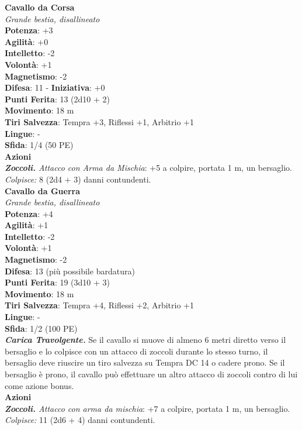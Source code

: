 \begin{multicols}{2}
\medskip\textbf{Cavallo da Corsa}\\
\emph{Grande bestia, disallineato}\\
\textbf{Potenza}: +3\\
\textbf{Agilità}: +0\\
\textbf{Intelletto}: -2\\
\textbf{Volontà}: +1\\
\textbf{Magnetismo}: -2\\
\textbf{Difesa}: 11 - \textbf{Iniziativa}: +0\\
\textbf{Punti Ferita}: 13 (2d10 + 2)\\
\textbf{Movimento}: 18 m\\
\textbf{Tiri Salvezza}: Tempra +3, Riflessi +1, Arbitrio +1 \\
\textbf{Lingue}: -\\
\textbf{Sfida}: 1/4 (50 PE)\smallskip\\
\smallskip\textbf{Azioni}\\
\emph{\textbf{Zoccoli.} Attacco con Arma da Mischia}: +5 a colpire, portata 1 m, un bersaglio.\\
\emph{Colpisce:} 8 (2d4 + 3) danni contundenti.\\

\medskip\textbf{Cavallo da Guerra}\\
\emph{Grande bestia, disallineato}\\
\textbf{Potenza}: +4\\
\textbf{Agilità}: +1\\
\textbf{Intelletto}: -2\\
\textbf{Volontà}: +1\\
\textbf{Magnetismo}: -2\\
\textbf{Difesa}: 13 (più possibile bardatura)\\
\textbf{Punti Ferita}: 19 (3d10 + 3)\\
\textbf{Movimento}: 18 m\\
\textbf{Tiri Salvezza}:  Tempra +4, Riflessi +2, Arbitrio +1 \\
\textbf{Lingue}: -\\
\textbf{Sfida}: 1/2 (100 PE)\smallskip\\
\emph{\textbf{Carica Travolgente.}} Se il cavallo si muove di almeno 6 metri diretto verso il bersaglio e lo colpisce con un attacco di zoccoli durante lo stesso turno, il bersaglio deve riuscire un tiro salvezza su Tempra DC 14 o cadere prono. Se il bersaglio è prono, il cavallo può effettuare un altro attacco di zoccoli contro di lui come azione bonus. \\
\smallskip\textbf{Azioni}\\
\emph{\textbf{Zoccoli.} Attacco con arma da mischia}: +7 a colpire, portata 1 m, un bersaglio.\\
\emph{Colpisce:} 11 (2d6 + 4) danni contundenti.\\


\end{multicols}
